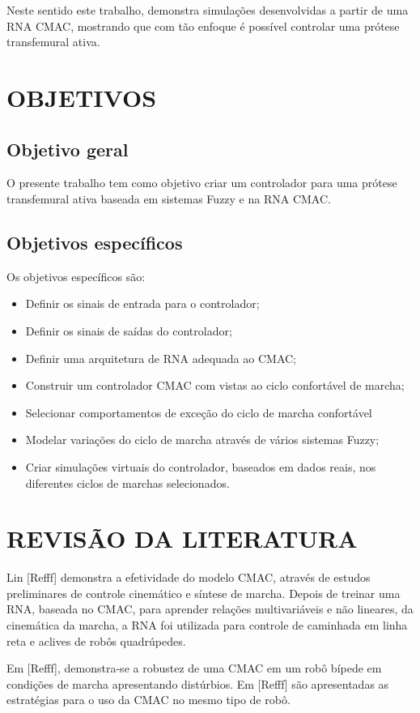 \documentclass[a4paper, 12pt] {report}
\begin{document}
	Neste sentido este trabalho, demonstra simulações desenvolvidas a partir de uma RNA CMAC, mostrando que com tão enfoque é possível controlar uma prótese transfemural ativa.
	\section{OBJETIVOS}
		\subsection{Objetivo geral}
			O presente trabalho tem como objetivo criar um controlador para uma prótese transfemural ativa baseada em sistemas Fuzzy e na RNA CMAC. 

		\subsection{Objetivos específicos}
			Os objetivos específicos são:
			\begin{itemize}
				\item Definir os sinais de entrada para o controlador;
				\item Definir os sinais de saídas do controlador;
				\item Definir uma arquitetura de RNA adequada ao CMAC;
				\item Construir um controlador CMAC com vistas ao ciclo confortável de marcha;
				\item Selecionar comportamentos de exceção do ciclo de marcha confortável
				\item Modelar variações do ciclo de marcha através de vários sistemas Fuzzy;
				\item Criar simulações virtuais do controlador, baseados em dados reais, nos diferentes ciclos de marchas selecionados.
			\end{itemize}

	\section{REVISÃO DA LITERATURA}
		Lin [Refff] demonstra a efetividade do modelo CMAC, através de estudos preliminares de controle cinemático e síntese de marcha. Depois de treinar uma RNA, baseada no CMAC, para aprender relações multivariáveis e não lineares, da cinemática da marcha, a RNA foi utilizada para controle de caminhada em linha reta e aclives de robôs quadrúpedes.

	Em [Refff], demonstra-se a robustez de uma CMAC em um robô bípede em condições de marcha apresentando distúrbios. Em [Refff] são apresentadas as estratégias para o uso da CMAC no mesmo tipo de robô.
\end{document}
